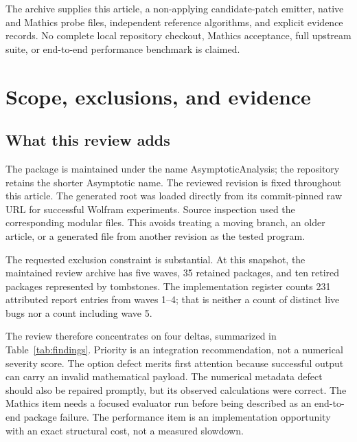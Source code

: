 \documentclass[11pt,letterpaper]{article}
\newcommand{\code}[1]{\texttt{\detokenize{#1}}}
\begin{document}
The archive supplies this article, a non-applying candidate-patch emitter, native and Mathics probe files, independent reference algorithms, and explicit evidence records. No complete local repository checkout, Mathics acceptance, full upstream suite, or end-to-end performance benchmark is claimed.

\newpage
\begingroup
\small
\setlength{\parskip}{0pt}
\makeatletter
\renewcommand*\l@section{\@dottedtocline{1}{0em}{1.8em}}
\makeatother
\tableofcontents
\endgroup
\newpage

\section{Scope, exclusions, and evidence}
\label{sec:scope}

\subsection{What this review adds}
The package is maintained under the name AsymptoticAnalysis; the repository retains the shorter Asymptotic name. The reviewed revision is fixed throughout this article. The generated root \code{AsymptoticAnalysis.wl} was loaded directly from its commit-pinned raw URL for successful Wolfram experiments. Source inspection used the corresponding modular files. This avoids treating a moving branch, an older article, or a generated file from another revision as the tested program.~\cite{core,status}

The requested exclusion constraint is substantial. At this snapshot, the maintained review archive has five waves, 35 retained packages, and ten retired packages represented by tombstones. The implementation register counts 231 attributed report entries from waves 1--4; that is neither a count of distinct live bugs nor a count including wave 5.~\cite{reviewindex,status,wave5}

The review therefore concentrates on four deltas, summarized in Table~\ref{tab:findings}. Priority is an integration recommendation, not a numerical severity score. The option defect merits first attention because successful output can carry an invalid mathematical payload. The numerical metadata defect should also be repaired promptly, but its observed calculations were correct. The Mathics item needs a focused evaluator run before being described as an end-to-end package failure. The performance item is an implementation opportunity with an exact structural cost, not a measured slowdown.
\end{document}
